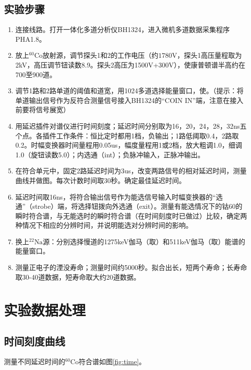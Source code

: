 \documentclass{article}
\begin{document}
\subsection{实验步骤}
\begin{enumerate}
    \item 连接线路。打开一体化多道分析仪BH1324，进入微机多道数据采集程序PHA1.8。
    \item 放上$^{60}\text{Co}$放射源，调节探头1和2的工作电压（约$\si{1780\V}$，探头1高压量程取为2kV，高压调节钮读数8.9。探头2高压为1500V+300V），使康普顿谱半高约在700至900道。
    \item 调节1路和2路单道的阈值和道宽，用1024多道选择能量窗口，使。（提示：将单道输出信号作为反符合测量信号接入BH1324的“COIN IN”端，注意在接入前要将信号展宽）
    \item 用延迟插件对谱仪进行时间刻度；延迟时间分别取为16，20，24，28，32ns五个点。各插件工作条件：恒比定时都用1档，负输出；1路低阈取0.4，2路取0.2。时幅变换器时间量程用0.05us，幅度量程用1或2档，放大粗调1.0，细调1.0（旋钮读数5.0）；内选通（int）；负脉冲输入，正脉冲输出。
    \item 在符合单元中，固定2路延迟时间为3us，改变两路信号的相对延迟时间，测量曲线并做图。每次计数时间取30秒。确定最佳延迟时间。
    \item 延迟时间取16ns，将符合输出信号作为能选信号输入时幅变换器的“选通”（strobe）端，将选择钮拨向外选通（exit）。测量有能选情况下的钴60的瞬时符合谱，与无能选时的瞬时符合谱（在时间刻度时已做过）比较，确定两种情况下相应的分辨时间，并说明能选对分辨时间的影响。
    \item 换上$^{22}\text{Na}$源：分别选择慢道的1275keV伽马（取）和511keV伽马（取）能谱的能量窗口。
    \item 测量正电子的湮没寿命；测量时间约5000秒。拟合出长，短两个寿命；长寿命取30-40道数据，短寿命取大约20道数据。
\end{enumerate}
\section{实验数据处理}
\subsection{时间刻度曲线}
测量不同延迟时间的$^{60}\text{Co}$符合谱如图\ref{fig:time}。
\end{document}
